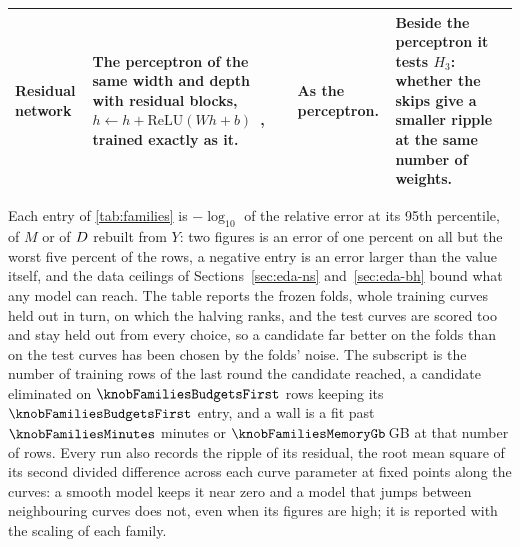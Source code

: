\begin{table}[!htb]
\begin{tabular}{@{}p{}p{}p{}p{}@{}}
Residual network & The perceptron of the same width and depth with residual blocks, $h \leftarrow h + \mathrm{ReLU}(W h + b)$~\citep{He2016_ResNet}, trained exactly as it. & As the perceptron. & Beside the perceptron it tests $H_3$: whether the skips give a smaller ripple at the same number of weights. \\
\bottomrule
\end{tabular}
\end{table}

Each entry of \cref{tab:families} is $-\log_{10}$ of the relative error at its 95th percentile, of $M$ or of $D$ rebuilt from $Y$: two figures is an error of one percent on all but the worst five percent of the rows, a negative entry is an error larger than the value itself, and the data ceilings of Sections~\ref{sec:eda-ns} and~\ref{sec:eda-bh} bound what any model can reach. The table reports the frozen folds, whole training curves held out in turn, on which the halving ranks, and the test curves are scored too and stay held out from every choice, so a candidate far better on the folds than on the test curves has been chosen by the folds' noise. The subscript is the number of training rows of the last round the candidate reached, a candidate eliminated on $\knobFamiliesBudgetsFirst$ rows keeping its $\knobFamiliesBudgetsFirst$ entry, and a wall is a fit past $\knobFamiliesMinutes$ minutes or $\knobFamiliesMemoryGb$\,GB at that number of rows. Every run also records the ripple of its residual, the root mean square of its second divided difference across each curve parameter at fixed points along the curves: a smooth model keeps it near zero and a model that jumps between neighbouring curves does not, even when its figures are high; it is reported with the scaling of each family.
